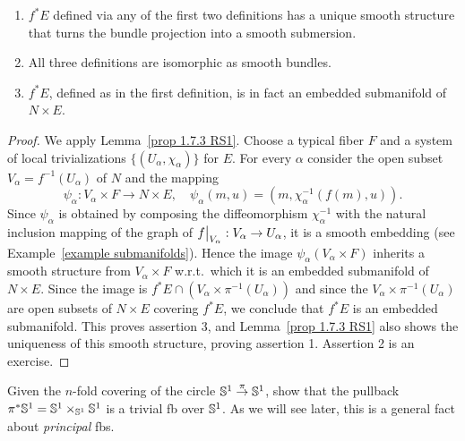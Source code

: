 \begin{prop}[{{\cite[Prop.~2.6.1]{RS1}}}]\label{prop 2.6.1 RS1}
\begin{enumerate}
    \item $f^\ast E$ defined via any of the first two definitions has a unique smooth structure that turns the bundle projection into a smooth submersion.
    \item All three definitions are isomorphic as smooth bundles.
    \item $f^\ast E$, defined as in the first definition, is in fact an embedded submanifold of $N\times E$.
\end{enumerate} 
\end{prop}
\begin{proof}
    We apply Lemma~\ref{prop 1.7.3 RS1}. Choose a typical fiber $F$ and a system of local trivializations $\{(U_\alpha,\chi_\alpha)\}$ for $E$. For every $\alpha$ consider the open subset $V_\alpha=f^{-1}(U_\alpha)$ of $N$ and the mapping  
    \[\psi_\alpha:V_\alpha\times F\to N\times E,\quad \psi_\alpha(m,u)=(m,\chi_\alpha^{-1}(f(m),u)).\]
    Since $\psi_\alpha$ is obtained by composing the diffeomorphism $\chi_\alpha^{-1}$ with the natural inclusion mapping of the graph of $\restr{f}{V_\alpha}:V_\alpha\to U_\alpha$, it is a smooth embedding (see Example~\ref{example submanifolds}). Hence the image $\psi_\alpha(V_\alpha\times F)$ inherits a smooth structure from $V_\alpha\times F$ w.r.t.\ which it is an embedded submanifold of $N\times E$. Since the image is $f^\ast E\cap (V_\alpha\times\pi^{-1}(U_\alpha))$ and since the $V_\alpha\times\pi^{-1}(U_\alpha)$ are open subsets of $N\times E$ covering $f^\ast E$, we conclude that $f^\ast E$ is an embedded submanifold. This proves assertion 3, and Lemma~\ref{prop 1.7.3 RS1} also shows the uniqueness of this smooth structure, proving assertion 1. Assertion 2 is an exercise.
\end{proof}

\begin{xca}
    Given the $n$-fold covering of the circle $\mathbb{S}^1\overset{\pi}{\to}\mathbb{S}^1$, show that the pullback $\pi^\ast \mathbb{S}^1=\mathbb{S}^1\times_{\mathbb{S}^1} \mathbb{S}^1$ is a trivial \gls{fb} over $\mathbb{S}^1$. As we will see later, this is a general fact about \emph{principal} \glspl{fb}.
\end{xca}

